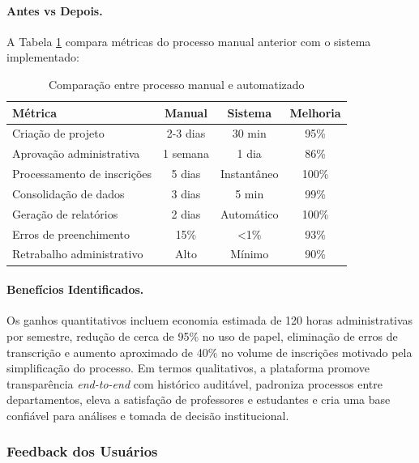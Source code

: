 \documentclass[portuguese]{sbc2025}%
\begin{document}
\paragraph{Antes vs Depois.}

A Tabela \ref{tab:comparacao} compara métricas do processo manual anterior com o sistema implementado:

\begin{table}[t]
  \centering
  \caption{Comparação entre processo manual e automatizado}
  \label{tab:comparacao}
  \begin{adjustbox}{max width=\textwidth}
    \begin{tabular}{|l|c|c|c|}
      \hline
      \textbf{Métrica} & \textbf{Manual} & \textbf{Sistema} & \textbf{Melhoria} \\
      \hline
      Criação de projeto & 2-3 dias & 30 min & 95\% \\
      Aprovação administrativa & 1 semana & 1 dia & 86\% \\
      Processamento de inscrições & 5 dias & Instantâneo & 100\% \\
      Consolidação de dados & 3 dias & 5 min & 99\% \\
      Geração de relatórios & 2 dias & Automático & 100\% \\
      Erros de preenchimento & 15\% & <1\% & 93\% \\
      Retrabalho administrativo & Alto & Mínimo & 90\% \\
      \hline
    \end{tabular}
  \end{adjustbox}
\end{table}

\paragraph{Benefícios Identificados.}

Os ganhos quantitativos incluem economia estimada de 120 horas administrativas por semestre, redução de cerca de 95\% no uso de papel, eliminação de erros de transcrição e aumento aproximado de 40\% no volume de inscrições motivado pela simplificação do processo. Em termos qualitativos, a plataforma promove transparência \textit{end-to-end} com histórico auditável, padroniza processos entre departamentos, eleva a satisfação de professores e estudantes e cria uma base confiável para análises e tomada de decisão institucional.

\subsubsection{Feedback dos Usuários}
\end{document}

